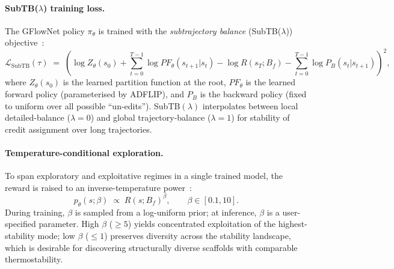 \documentclass[11pt,oneside]{amsbook}
\numberwithin{equation}{section}
\theoremstyle{plain}
\theoremstyle{definition}
\theoremstyle{remark}
\begin{document}
\paragraph{SubTB($\lambda$) training loss.}
The GFlowNet policy $\pi_\theta$ is trained with the
\emph{subtrajectory balance} (SubTB($\lambda$)) objective~\cite{MalkinEtAl2022}:
\begin{equation}
  \mathcal{L}_{\mathrm{SubTB}}(\tau)
  \;=\;
  \left(
    \log Z_\theta(s_0)
    + \sum_{t=0}^{T-1} \log PF_\theta(s_{t+1}|s_t)
    - \log R(s_T; B_f)
    - \sum_{t=0}^{T-1} \log P_B(s_t|s_{t+1})
  \right)^2,
\label{eq:SubTB}
\end{equation}
where $Z_\theta(s_0)$ is the learned partition function at the root,
$PF_\theta$ is the learned forward policy (parameterised by ADFLIP), and
$P_B$ is the backward policy (fixed to uniform over all possible
``un-edits'').  SubTB$(\lambda)$ interpolates between local detailed-balance
($\lambda=0$) and global trajectory-balance ($\lambda=1$) for stability
of credit assignment over long trajectories.

\paragraph{Temperature-conditional exploration.}
To span exploratory and exploitative regimes in a single trained model,
the reward is raised to an inverse-temperature power~\cite{PanTemperature2023}:
\[
  p_\theta(s;\beta) \;\propto\; R(s;B_f)^\beta,
  \qquad \beta \in [0.1, 10].
\]
During training, $\beta$ is sampled from a log-uniform prior; at inference,
$\beta$ is a user-specified parameter.  High $\beta$ ($\ge 5$) yields
concentrated exploitation of the highest-stability mode; low $\beta$ ($\le 1$)
preserves diversity across the stability landscape, which is desirable
for discovering structurally diverse scaffolds with comparable thermostability.
\end{document}
